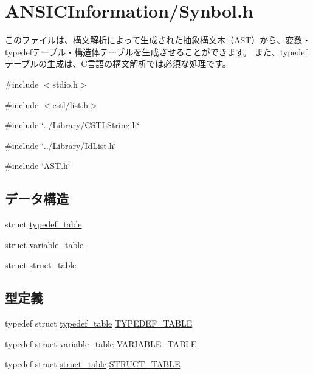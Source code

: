 \section{ANSICInformation/Synbol.h}
\label{Synbol_8h}


このファイルは、構文解析によって生成された抽象構文木（AST）から、変数・typedefテーブル・構造体テーブルを生成させることができます。 また、typedefテーブルの生成は、C言語の構文解析では必須な処理です。  


{\ttfamily \#include $<$stdio.h$>$}\par
{\ttfamily \#include $<$cstl/list.h$>$}\par
{\ttfamily \#include \char`\"{}../Library/CSTLString.h\char`\"{}}\par
{\ttfamily \#include \char`\"{}../Library/IdList.h\char`\"{}}\par
{\ttfamily \#include \char`\"{}AST.h\char`\"{}}\par
\subsection*{データ構造}
\begin{DoxyCompactItemize}
\item 
struct \hyperlink{structtypedef__table}{typedef\_\-table}
\item 
struct \hyperlink{structvariable__table}{variable\_\-table}
\item 
struct \hyperlink{structstruct__table}{struct\_\-table}
\end{DoxyCompactItemize}
\subsection*{型定義}
\begin{DoxyCompactItemize}
\item 
typedef struct \hyperlink{structtypedef__table}{typedef\_\-table} \hyperlink{Synbol_8h_acea964af3672f8ac88991ff14c52694a}{TYPEDEF\_\-TABLE}
\item 
typedef struct \hyperlink{structvariable__table}{variable\_\-table} \hyperlink{Synbol_8h_aba95a019bb71ccd5e3e128174d299272}{VARIABLE\_\-TABLE}
\item 
typedef struct \hyperlink{structstruct__table}{struct\_\-table} \hyperlink{Synbol_8h_af5018610fe25e6d5a5a8bbe35d944ec5}{STRUCT\_\-TABLE}
\end{DoxyCompactItemize}

